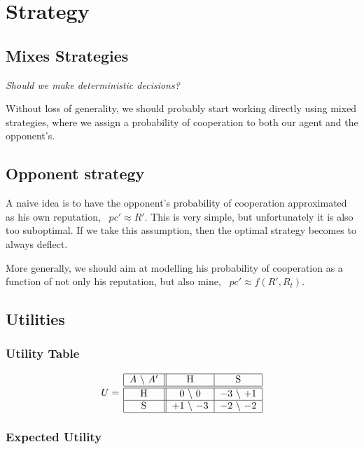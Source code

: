\documentclass[10pt,fleqn]{article}
\begin{document}
\section{Strategy}

\subsection{Mixes Strategies}
\emph{Should we make deterministic decisions?}

Without loss of generality, we should probably start working directly using
mixed strategies, where we assign a probability of cooperation to both our agent
and the opponent's.

\subsection{Opponent strategy}

A naive idea is to have the opponent's probability of cooperation approximated
as his own reputation, \ie\ $pc' \approx R'$. This is very simple, but
unfortunately it is also too suboptimal. If we take this assumption, then the
optimal strategy becomes to always deflect.

More generally, we should aim at modelling his probability of cooperation as a
function of not only his reputation, but also mine, \ie\ $pc' \approx f(R',
R_t)$.

\subsection{Utilities}

\subsubsection{Utility Table}
\begin{equation*}
  U =\, 
    \begin{tabular}{|c||c|c|}
      \hline
      $A$ \textbackslash\ $A'$ & H & S \\
      \hline\hline
      H & $0$ \textbackslash\ $0$ & $-3$ \textbackslash\ $+1$ \\
      \hline
      S & $+1$ \textbackslash\ $-3$ & $-2$ \textbackslash\ $-2$ \\
      \hline
    \end{tabular}
\end{equation*}

\subsubsection{Expected Utility}
\end{document}
